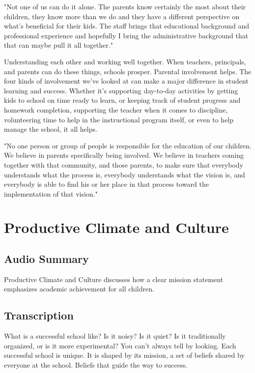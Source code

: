"Not one of us can do it alone. The parents know certainly the most about their children, they know more than we do and they have a different perspective on what's beneficial for their kids. The staff brings that educational background and professional experience and hopefully I bring the administrative background that that can maybe pull it all together."

Understanding each other and working well together. When teachers, principals, and parents can do these things, schools prosper. Parental involvement helps. The four kinds of involvement we've looked at can make a major difference in student learning and success. Whether it's supporting day-to-day activities by getting kids to school on time ready to learn, or keeping track of student progress and homework completion, supporting the teacher when it comes to discipline, volunteering time to help in the instructional program itself, or even to help manage the school, it all helps.

"No one person or group of people is responsible for the education of our children. We believe in parents specifically being involved. We believe in teachers coming together with that community, and those parents, to make sure that everybody understands what the process is, everybody understands what the vision is, and everybody is able to find his or her place in that process toward the implementation of that vision."

\section{Productive Climate and Culture}

\subsection{Audio Summary}

Productive Climate and Culture discusses how a clear mission statement emphasizes academic achievement for all children.

\subsection{Transcription}

What is a successful school like? Is it noisy? Is it quiet? Is it traditionally organized, or is it more experimental? You can't always tell by looking. Each successful school is unique. It is shaped by its mission, a set of beliefs shared by everyone at the school. Beliefs that guide the way to success.

